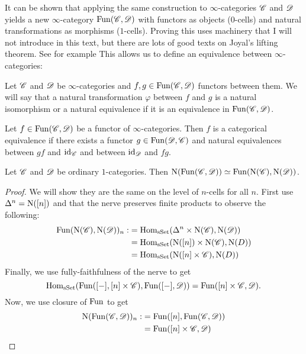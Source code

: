 \documentclass[../../thesis.tex]{subfiles}
\begin{document}
It can be shown that applying the same construction to $\infty$-categories $\mathscr{C}$ and $\mathscr{D}$ yields a new $\infty$-category $\mathrm{Fun}(\mathscr{C}, \mathscr{D})$ with functors as objects ($0$-cells) and natural transformations as morphisms ($1$-cells).
Proving this uses machinery that I will not introduce in this text, but there are lots of good texts on Joyal's lifting theorem.
See for example 
This allows us to define an equivalence between $\infty$-categories:
\begin{definition}
    Let $\mathscr{C}$ and $\mathscr{D}$ be $\infty$-categories and $f,g \in \mathrm{Fun}(\mathscr{C},\mathscr{D})$ functors between them.
    We will say that a natural transformation $\varphi$ between $f$ and $g$ is a natural isomorphism  or a natural equivalence if it is an equivalence in $ \mathrm{Fun}(\mathscr{C},\mathscr{D})$.
\end{definition}
\begin{definition}
    Let $f \in \mathrm{Fun}(\mathscr{C},\mathscr{D})$ be a functor of $\infty$-categories.
    Then $f$ is a categorical equivalence if there exists a functor $g\in\mathrm{Fun}(\mathscr{D},\mathscr{C})$ and natural equivalences between $gf$ and $\operatorname{id}_{\mathscr{C}}$ and between $\operatorname{id}_{\mathscr{D}}$ and $fg$.
\end{definition}
\begin{proposition}
    Let $\mathscr{C}$ and $\mathscr{D}$ be ordinary $1$-categories.
    Then $\mathrm{N}(\mathrm{Fun}(\mathscr{C}, \mathscr{D})) \simeq \mathrm{Fun}(\mathrm{N}(\mathscr{C}), \mathrm{N}(\mathscr{D}))$.
\end{proposition}
\begin{proof}
    We will show they are the same on the level of $n$-cells for all $n$.
    First use $\Delta^n = \mathrm{N}([n])$ and that the nerve preserves finite products to observe the following:
    \begin{align}
        \mathrm{Fun}(\mathrm{N}(\mathscr{C}), \mathrm{N}(\mathscr{D}))_n: & = \mathrm{Hom}_{\mathrm{sSet}}(\Delta^n \times \mathrm{N}(\mathscr{C}), \mathrm{N}(\mathscr{D}))  \\
                                        & = \mathrm{Hom}_{\mathrm{sSet}}(\mathrm{N}([n])\times \mathrm{N}(\mathscr{C}), \mathrm{N}(D)) \\
                                        & = \mathrm{Hom}_{\mathrm{sSet}}(\mathrm{N}([n]\times \mathscr{C}), \mathrm{N}(D))
    \end{align}
    Finally, we use fully-faithfulness of the nerve to get
    \[
        \mathrm{Hom}_{\mathrm{sSet}}(\mathrm{Fun}([-], [n]\times \mathscr{C}) , \mathrm{Fun}([-], \mathscr{D})) = \mathrm{Fun}([n]\times \mathscr{C}, \mathscr{D}).
    \]
    Now, we use closure of $\mathrm{Fun}$ to get
    \begin{align}
        \mathrm{N}(\mathrm{Fun}(\mathscr{C}, \mathscr{D}))_n: & = \mathrm{Fun}([n], \mathrm{Fun}(\mathscr{C}, \mathscr{D})) \\
                                & = \mathrm{Fun}([n]\times \mathscr{C}, \mathscr{D})
    \end{align}
\end{proof}
\end{document}
